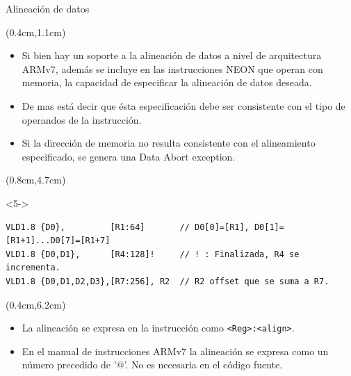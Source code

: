\begin{frame}[fragile]{Alineación de datos}
 \begin{textblock*}{\textwidth}(0.4cm,1.1cm)
  \begin{itemize}[<+(1)->]\justifying
   \item Si bien hay un soporte a la alineación de datos a nivel de arquitectura ARMv7, además se incluye en las instrucciones NEON que operan con memoria, la capacidad de especificar la alineación de datos deseada.
   \item De mas está decir que ésta especificación debe ser consistente con el tipo de operandos de la instrucción.
   \item Si la dirección de memoria no resulta consistente con el alineamiento especificado, se genera una Data Abort exception.
  \end{itemize}
 \end{textblock*}
 \begin{textblock*}{\textwidth}(0.8cm,4.7cm)
  \begin{onlyenv}<5->
   \begin{lstlisting}[basicstyle=\scriptsize,numbers=none]
VLD1.8 {D0},         [R1:64]       // D0[0]=[R1], D0[1]=[R1+1]...D0[7]=[R1+7]
VLD1.8 {D0,D1},      [R4:128]!     // ! : Finalizada, R4 se incrementa.
VLD1.8 {D0,D1,D2,D3},[R7:256], R2  // R2 offset que se suma a R7.
   \end{lstlisting}
  \end{onlyenv} 
 \end{textblock*}
 \begin{textblock*}{\textwidth}(0.4cm,6.2cm)
  \begin{itemize}[<+(2)->]\justifying
   \item La alineación se expresa en la instrucción como \texttt{<Reg>:<align>}.
   \item En el manual de instrucciones ARMv7 la alineación se expresa como un número precedido de '@'. No es necesaria en el código fuente.
  \end{itemize}
 \end{textblock*} 
\end{frame}


